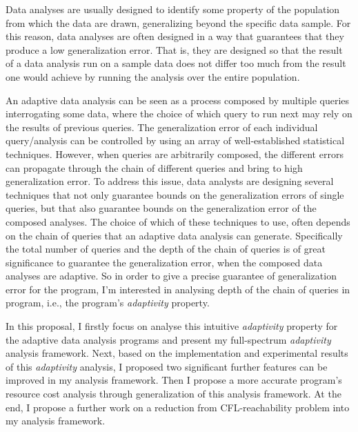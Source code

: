 Data analyses are usually designed to identify some property of the population from which the data are drawn, generalizing beyond the specific data sample. For this reason, data analyses are often designed in a way that guarantees that they produce a low generalization error.
   That is, they are designed so that the result of a data analysis run on a sample data does not differ too much from the result one would achieve by running the analysis over the entire population. 
   
   An adaptive data analysis can be seen as a process composed by multiple queries interrogating some data, where the choice of which query to run next may rely on the results of previous queries. 
   The generalization error of each individual query/analysis can be controlled by using an array of well-established statistical techniques.
   However, when queries are arbitrarily composed, the different errors can propagate through the chain of different queries and bring to high generalization error. 
   To address this issue, data analysts are designing several techniques that not only guarantee bounds on the generalization errors of single queries, but that also guarantee bounds on the generalization error of the composed analyses. 
   The choice of which of these techniques to use, 
   often depends on the chain of queries that an adaptive data analysis can generate.
   Specifically the total number of queries and the depth of the chain of queries is of great significance 
   to guarantee the generalization error, 
   when the composed data analyses are adaptive. 
   So in order to give a precise guarantee of generalization error
   for the program,
    I'm interested in analysing depth of the chain of queries in program, i.e., the program's \emph{adaptivity} property.

   In this proposal, I firstly focus on analyse this intuitive \emph{adaptivity} property for the adaptive data analysis programs and present 
   my full-spectrum \emph{adaptivity} analysis framework.
   Next, based on the implementation and experimental results of this \emph{adaptivity} analysis, 
   I proposed two significant 
   further features can be improved in my analysis framework.
   Then I propose 
   a more accurate program's resource cost analysis through
   generalization of this analysis framework.
   At the end, I propose a further work on a reduction from CFL-reachability problem into my analysis framework.
